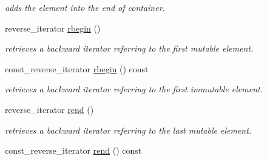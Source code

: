 \begin{DoxyCompactItemize}
\begin{DoxyCompactList}\small\item\em adds the element into the end of container. \end{DoxyCompactList}\item 
\hypertarget{classhryky_1_1_vector_a666d26f9ebb3d4979031d1e23ea96697}{reverse\-\_\-iterator \hyperlink{classhryky_1_1_vector_a666d26f9ebb3d4979031d1e23ea96697}{rbegin} ()}\label{classhryky_1_1_vector_a666d26f9ebb3d4979031d1e23ea96697}

\begin{DoxyCompactList}\small\item\em retrieves a backward iterator referring to the first mutable element. \end{DoxyCompactList}\item 
\hypertarget{classhryky_1_1_vector_aa57c7fc8f218f0af46e526896a1ce4b1}{const\-\_\-reverse\-\_\-iterator \hyperlink{classhryky_1_1_vector_aa57c7fc8f218f0af46e526896a1ce4b1}{rbegin} () const }\label{classhryky_1_1_vector_aa57c7fc8f218f0af46e526896a1ce4b1}

\begin{DoxyCompactList}\small\item\em retrieves a backward iterator referring to the first immutable element. \end{DoxyCompactList}\item 
\hypertarget{classhryky_1_1_vector_adbdf08d14d8a77fba3573a8bc7b6bfd5}{reverse\-\_\-iterator \hyperlink{classhryky_1_1_vector_adbdf08d14d8a77fba3573a8bc7b6bfd5}{rend} ()}\label{classhryky_1_1_vector_adbdf08d14d8a77fba3573a8bc7b6bfd5}

\begin{DoxyCompactList}\small\item\em retrieves a backward iterator referring to the last mutable element. \end{DoxyCompactList}\item 
\hypertarget{classhryky_1_1_vector_a490a3a1b1aa1f3a31e02bd817f414398}{const\-\_\-reverse\-\_\-iterator \hyperlink{classhryky_1_1_vector_a490a3a1b1aa1f3a31e02bd817f414398}{rend} () const }\label{classhryky_1_1_vector_a490a3a1b1aa1f3a31e02bd817f414398}


\end{DoxyCompactItemize}
